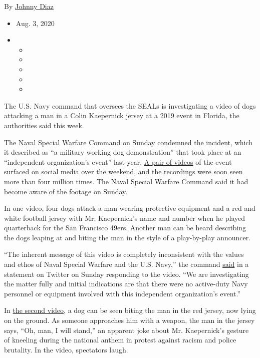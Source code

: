 By \href{https://www.nytimes3xbfgragh.onion/by/johnny-diaz}{Johnny Diaz}

\begin{itemize}
\item
  Aug. 3, 2020
\item
  \begin{itemize}
  \item
  \item
  \item
  \item
  \item
  \end{itemize}
\end{itemize}

The U.S. Navy command that oversees the SEALs is investigating a video
of dogs attacking a man in a Colin Kaepernick jersey at a 2019 event in
Florida, the authorities said this week.

The Naval Special Warfare Command on Sunday condemned the incident,
which it described as ``a military working dog demonstration'' that took
place at an ``independent organization's event'' last year.
\href{https://twitter.com/BillyCorben/status/1289961836264095744}{A pair
of videos} of the event surfaced on social media over the weekend, and
the recordings were soon seen more than four million times. The Naval
Special Warfare Command said it had become aware of the footage on
Sunday.

In one video, four dogs attack a man wearing protective equipment and a
red and white football jersey with Mr. Kaepernick's name and number when
he played quarterback for the San Francisco 49ers. Another man can be
heard describing the dogs leaping at and biting the man in the style of
a play-by-play announcer.

``The inherent message of this video is completely inconsistent with the
values and ethos of Naval Special Warfare and the U.S. Navy,'' the
command
\href{https://twitter.com/us_navyseals/status/1290034412218802176}{said}
in a statement on Twitter on Sunday responding to the video. ``We are
investigating the matter fully and initial indications are that there
were no active-duty Navy personnel or equipment involved with this
independent organization's event.''

In \href{https://twitter.com/BillyCorben/status/1289979415879798784}{the
second video}, a dog can be seen biting the man in the red jersey, now
lying on the ground. As someone approaches him with a weapon, the man in
the jersey says, ``Oh, man, I will stand,'' an apparent joke about Mr.
Kaepernick's gesture of kneeling during the national anthem in protest
against racism and police brutality. In the video, spectators laugh.

